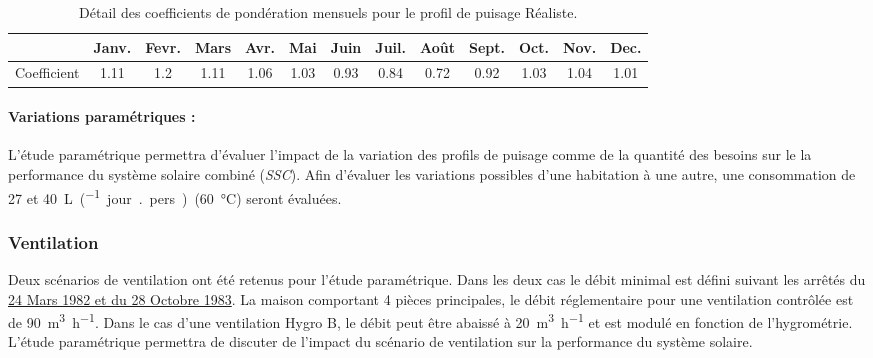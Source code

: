 \begin{table}
\centering
\begin{tabular}{l*{12}{c}}
    \toprule
                & Janv. & Fevr. & Mars & Avr. & Mai & Juin & Juil. & Août & Sept. & Oct. & Nov. & Dec. \\
    \midrule
    Coefficient & 1.11   & 1.2   & 1.11  & 1.06  & 1.03  & 0.93   & 0.84    & 0.72   & 0.92    & 1.03  & 1.04  & 1.01  \\
    \bottomrule
\end{tabular}
\caption{Détail des coefficients de pondération mensuels pour le profil de
         puisage Réaliste.}
         \label{tab:coef_mois}
\end{table}

\paragraph{Variations paramétriques :} %
\label{par:variations_parametriques}
L’étude paramétrique permettra d’évaluer l’impact de la variation des profils de puisage
comme de la quantité des besoins sur le la performance du système solaire combiné
(\emph{SSC}). Afin d’évaluer les variations possibles d’une habitation à une autre, une
consommation de 27 et \SI{40}{\liter\per(jour {.} pers)}~(\SI{60}{\celsius}) seront évaluées.


\subsubsection{Ventilation} %
\label{ssub:ventilation}

Deux scénarios de ventilation ont été retenus pour l’étude paramétrique. Dans les deux cas
le débit minimal est défini suivant les arrêtés du
\href{https://www.legifrance.gouv.fr/affichTexte.do?cidTexte=JORFTEXT000000862344}{24 Mars
1982 et du 28 Octobre 1983}. La maison comportant 4 pièces principales, le débit réglementaire
pour une ventilation contrôlée est de \SI{90}{\meter\cubed\per\hour}. Dans le cas d’une ventilation
Hygro B, le débit peut être abaissé à \SI{20}{\meter\cubed\per\hour} et est modulé en fonction
de l’hygrométrie. L’étude paramétrique permettra de discuter de l’impact du scénario
de ventilation sur la performance du système solaire.

